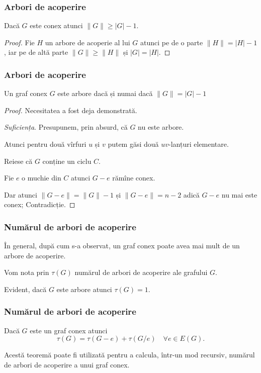 \begin{frame}
  \frametitle{Arbori de acoperire}


\begin{corollary}
Dacă $G$ este conex atunci $\|G\|\geq |G|-1$.
\end{corollary}
\begin{proof}
Fie $H$ un arbore de acoperie al lui $G$ atunci pe de o parte $\|H\|=|H|-1$, 
iar pe de altă parte $\|G\|\geq \|H\|$ și $|G|=|H|$.
\end{proof}
 
\end{frame}


\begin{frame}
  \frametitle{Arbori de acoperire}

\begin{corollary}
Un graf conex $G$ este arbore dacă și numai dacă $\|G\|=|G|-1$
\end{corollary}
\begin{proof}
Necesitatea a fost deja demonstrată. 

{\em Suficiența}. Presupunem, prin absurd, că $G$ nu este arbore. 

Atunci pentru două vîrfuri $u$ și $v$ putem găsi două $uv$-lanțuri elementare. 

Reiese că $G$ conține un ciclu $C$. 

Fie $e$ o muchie din $C$ atunci $G-e$ rămîne conex. 

Dar atunci $\|G-e\|=\|G\|-1$ și $\|G-e\|=n-2$ adică $G-e$ nu mai este conex; Contradicție.
\end{proof}
 
\end{frame}

\begin{frame}
  \frametitle{Numărul de arbori de acoperire}

În general, după cum s-a observat, un graf conex poate avea mai mult de un arbore de acoperire.

Vom nota prin $\tau(G)$ numărul de arbori de acoperire ale grafului $G$. 

Evident, dacă $G$ este arbore atunci $\tau(G)=1$.
\end{frame}

\begin{frame}
  \frametitle{Numărul de arbori de acoperire}

\begin{theorem}
Dacă $G$ este un graf conex atunci
\[
  \tau(G)=\tau(G-e)+\tau(G/e)	\quad	\forall e\in E(G).
\]

\end{theorem}

Acestă teoremă poate fi utilizată pentru a calcula, într-un mod recursiv, numărul de arbori de acoperire a unui graf conex.

\end{frame}

